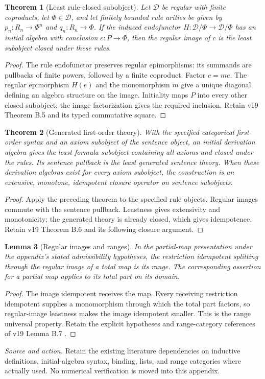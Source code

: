 \documentclass[11pt]{article}
\newtheorem{theorem}{Theorem}[section]
\newtheorem{lemma}[theorem]{Lemma}
\theoremstyle{definition}\newtheorem{definition}[theorem]{Definition}
\newcommand{\D}{\mathcal D}
\newcommand{\source}[1]{\par\smallskip\noindent\textit{Source and action.} #1\par\smallskip}
\begin{document}
\begin{theorem}[Least rule-closed subobject]
Let $\D$ be regular with finite coproducts, let $\Phi\in\D$,
and let finitely bounded rule arities be given by
$p_n:R_n\to\Phi^n$ and $q_n:R_n\to\Phi$.
If the induced endofunctor $H:\D/\Phi\to\D/\Phi$ has an
initial algebra with conclusion $c:P\to\Phi$, then the regular
image of $c$ is the least subobject closed under these rules.
\end{theorem}
\begin{proof}
The rule endofunctor preserves regular epimorphisms: its summands
are pullbacks of finite powers, followed by a finite coproduct.
Factor $c=me$. The regular epimorphism $H(e)$ and the monomorphism
$m$ give a unique diagonal defining an algebra structure on the
image. Initiality maps $P$ into every other closed subobject;
the image factorization gives the required inclusion. Retain
v19 Theorem B.5 and its typed commutative square.
\end{proof}

\begin{theorem}[Generated first-order theory]
With the specified categorical first-order syntax and an axiom
subobject of the sentence object, an initial derivation algebra
gives the least formula subobject containing all axioms and closed
under the rules. Its sentence pullback is the least generated
sentence theory. When these derivation algebras exist for every
axiom subobject, the construction is an extensive, monotone,
idempotent closure operator on sentence subobjects.
\end{theorem}
\begin{proof}
Apply the preceding theorem to the specified rule objects.
Regular images commute with the sentence pullback. Leastness gives
extensivity and monotonicity; the generated theory is already
closed, which gives idempotence. Retain v19 Theorem B.6 and its
following closure argument.
\end{proof}

\begin{lemma}[Regular images and ranges]
In the partial-map presentation under the appendix's stated
admissibility hypotheses, the restriction idempotent splitting
through the regular image of a total map is its range. The
corresponding assertion for a partial map applies to its total
part on its domain.
\end{lemma}
\begin{proof}
The image idempotent receives the map. Every receiving restriction
idempotent supplies a monomorphism through which the total part
factors, so regular-image leastness makes the image idempotent
smaller. This is the range universal property. Retain the explicit
hypotheses and range-category references of v19 Lemma B.7
\cite{RangeII}.
\end{proof}
\source{Retain the existing literature dependencies on inductive definitions, initial-algebra syntax, binding, lists, and range categories where actually used. No numerical verification is moved into this appendix.}
\end{document}

